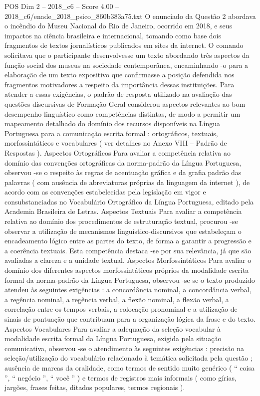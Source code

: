 \begin{textsample}{POS Dim 2 – 2018\_c6 – Score 4.00 – 2018\_c6/enade\_2018\_psico\_860b383a75.txt}
O enunciado da Questão 2 abordava o incêndio do Museu Nacional do Rio de Janeiro, ocorrido em 2018, e seus impactos na ciência brasileira e internacional, tomando como base dois fragmentos de textos jornalísticos publicados em sites da internet.
O comando solicitava que o participante desenvolvesse um texto abordando três aspectos da função social dos museus na sociedade contemporânea, encaminhando -o para a elaboração de um texto expositivo que confirmasse a posição defendida nos fragmentos motivadores a respeito da importância dessas instituições.
Para atender a essas exigências, o padrão de resposta utilizado na avaliação das questões discursivas de Formação Geral considerou aspectos relevantes ao bom desempenho linguístico como competências distintas, de modo a permitir um mapeamento detalhado do domínio dos recursos disponíveis na Língua Portuguesa para a comunicação escrita formal : ortográficos, textuais, morfossintáticos e vocabulares ( ver detalhes no Anexo VIII – Padrão de Respostas ).
Aspectos Ortográficos Para avaliar a competência relativa ao domínio das convenções ortográficas da norma-padrão da Língua Portuguesa, observou -se o respeito às regras de acentuação gráfica e da grafia padrão das palavras ( com ausência de abreviaturas próprias da linguagem da internet ), de acordo com as convenções estabelecidas pela legislação em vigor e consubstanciadas no Vocabulário Ortográfico da Língua Portuguesa, editado pela Academia Brasileira de Letras.
Aspectos Textuais Para avaliar a competência relativa ao domínio dos procedimentos de estruturação textual, procurou -se observar a utilização de mecanismos linguístico-discursivos que estabeleçam o encadeamento lógico entre as partes do texto, de forma a garantir a progressão e a coerência textuais.
Esta competência destaca -se por sua relevância, já que são avaliadas a clareza e a unidade textual.
Aspectos Morfossintáticos Para avaliar o domínio dos diferentes aspectos morfossintáticos próprios da modalidade escrita formal da norma-padrão da Língua Portuguesa, observou -se se o texto produzido atendeu às seguintes exigências : a concordância nominal, a concordância verbal, a regência nominal, a regência verbal, a flexão nominal, a flexão verbal, a correlação entre os tempos verbais, a colocação pronominal e a utilização de sinais de pontuação que contribuam para a organização lógica da frase e do texto.
Aspectos Vocabulares Para avaliar a adequação da seleção vocabular à modalidade escrita formal da Língua Portuguesa, exigida pela situação comunicativa, observou -se o atendimento às seguintes exigências : precisão na seleção/utilização do vocabulário relacionado à temática solicitada pela questão ; ausência de marcas da oralidade, como termos de sentido muito genérico ( “ coisa ”, “ negócio ”, “ você ” ) e termos de registros mais informais ( como gírias, jargões, frases feitas, ditados populares, termos regionais ).

\end{textsample}
